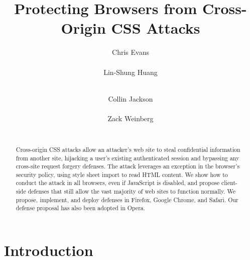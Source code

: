 \documentclass{acm_proc_article-sp}
\begin{document}
\title{Protecting Browsers from Cross-Origin CSS Attacks}
\author{
\alignauthor
Chris Evans\\
      \\
\alignauthor
Lin-Shung Huang\\
      \\
\and
\alignauthor
Collin Jackson\\
      \\
\alignauthor
Zack Weinberg\\
      \\
}

\newcommand{\todo}[1]{\textbf{[TODO: #1]}}

\maketitle
\begin{abstract}
Cross-origin CSS attacks allow an attacker's web site to steal confidential information from another site, hijacking a user's existing authenticated session and bypassing any cross-site request forgery defenses. The attack leverages an exception in the browser's security policy,
using style sheet import to read HTML content. We show how to conduct the attack in all browsers, even if JavaScript is disabled, and propose client-side defenses that still allow the vast majority of web sites to function normally. We propose, implement, and deploy defenses in Firefox, Google Chrome, and Safari. Our defense proposal has also been adopted in Opera.
\end{abstract}




\section{Introduction}
\end{document}
